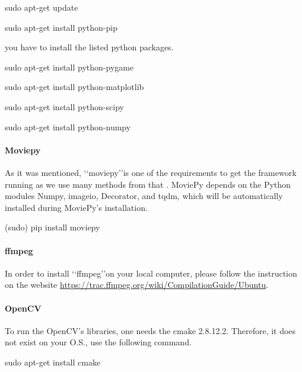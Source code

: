 \documentclass[[12pt,DIV14,BCOR12mm,a4paper,footexclude,headinclude,halfparskip-,twoside,openright,cleardoubleempty,idxtotoc,bibtotoc]{article}
\begin{document}
\begin{framed}

sudo apt-get update

sudo apt-get install python-pip

\end{framed}

you have to install the listed python packages.


\begin{framed}

sudo apt-get install python-pygame

sudo apt-get install python-matplotlib 

sudo apt-get install python-scipy

sudo apt-get install python-numpy


\end{framed}

\paragraph{Moviepy}

As it was mentioned, \lq\lq moviepy\rq\rq is one of the requirements to get the framework running as we use many methods from that \cite{moviepy} .
MoviePy depends on the Python modules Numpy, imageio, Decorator, and tqdm, which will be automatically installed during MoviePy's installation. 

\begin{framed}

(sudo) pip install moviepy

\end{framed}


\paragraph{ffmpeg}

In order to install \lq\lq ffmpeg\rq\rq on your local computer, please follow the instruction on the website \url{https://trac.ffmpeg.org/wiki/CompilationGuide/Ubuntu}.


\paragraph{OpenCV}

To run the OpenCV's libraries, one needs the cmake 2.8.12.2. Therefore, it does not exist on your O.S., use the following command.

 \begin{framed}

sudo apt-get install cmake

\end{framed} 
\end{document}
